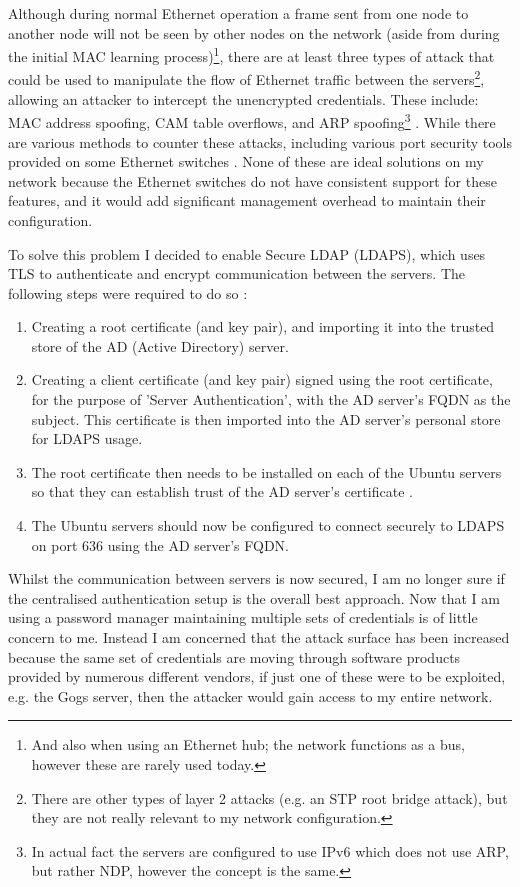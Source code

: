 \documentclass[11pt,a4paper]{scrartcl}
\begin{document}
\begin{refsection}
Although during normal Ethernet operation a frame sent from one node to another node will not be seen by other nodes on the network (aside from during the initial MAC learning process)\footnote{And also when using an Ethernet hub; the network functions as a bus, however these are rarely used today.}, there are at least three types of attack that could be used to manipulate the flow of Ethernet traffic between the servers\footnote{There are other types of layer 2 attacks (e.g. an STP root bridge attack), but they are not really relevant to my network configuration.}, allowing an attacker to intercept the unencrypted credentials.
These include: MAC address spoofing, CAM table overflows, and ARP spoofing\footnote{In actual fact the servers are configured to use IPv6 which does not use ARP, but rather NDP, however the concept is the same.} \cite{l2attacks}.
While there are various methods to counter these attacks, including various port security tools provided on some Ethernet switches \cite[193]{odom_icnd1}.
None of these are ideal solutions on my network because the Ethernet switches do not have consistent support for these features, and it would add significant management overhead to maintain their configuration.

To solve this problem I decided to enable Secure LDAP (LDAPS), which uses TLS to authenticate and encrypt communication between the servers. The following steps were required to do so \cite{microsoft_enable_ldaps, ad_ldaps_gist}:
\begin{enumerate}
	\item Creating a root certificate (and key pair), and importing it into the trusted store of the AD (Active Directory) server.
	\item Creating a client certificate (and key pair) signed using the root certificate, for the purpose of 'Server Authentication', with the AD server's FQDN as the subject. This certificate is then imported into the AD server's personal store for LDAPS usage.
	\item The root certificate then needs to be installed on each of the Ubuntu servers so that they can establish trust of the AD server's certificate \cite{ubuntu_ca_cert}.
	\item The Ubuntu servers should now be configured to connect securely to LDAPS on port 636 using the AD server's FQDN.
\end{enumerate}

Whilst the communication between servers is now secured, I am no longer sure if the centralised authentication setup is the overall best approach. Now that I am using a password manager maintaining multiple sets of credentials is of little concern to me. Instead I am concerned that the attack surface has been increased because the same set of credentials are moving through software products provided by numerous different vendors, if just one of these were to be exploited, e.g. the Gogs server, then the attacker would gain access to my entire network.

\printbibliography

\end{refsection}
\end{document}
